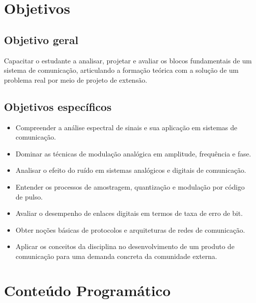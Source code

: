 \documentclass[11pt,a4paper]{article}
\begin{document}
\section{Objetivos}

\subsection*{Objetivo geral}

Capacitar o estudante a analisar, projetar e avaliar os blocos fundamentais de um sistema de comunicação, articulando a formação teórica com a solução de um problema real por meio de projeto de extensão.

\subsection*{Objetivos específicos}

\begin{itemize}[noitemsep]
  \item Compreender a análise espectral de sinais e sua aplicação em sistemas de comunicação.
  \item Dominar as técnicas de modulação analógica em amplitude, frequência e fase.
  \item Analisar o efeito do ruído em sistemas analógicos e digitais de comunicação.
  \item Entender os processos de amostragem, quantização e modulação por código de pulso.
  \item Avaliar o desempenho de enlaces digitais em termos de taxa de erro de bit.
  \item Obter noções básicas de protocolos e arquiteturas de redes de comunicação.
  \item Aplicar os conceitos da disciplina no desenvolvimento de um produto de comunicação para uma demanda concreta da comunidade externa.
\end{itemize}

\section{Conteúdo Programático}
\end{document}
